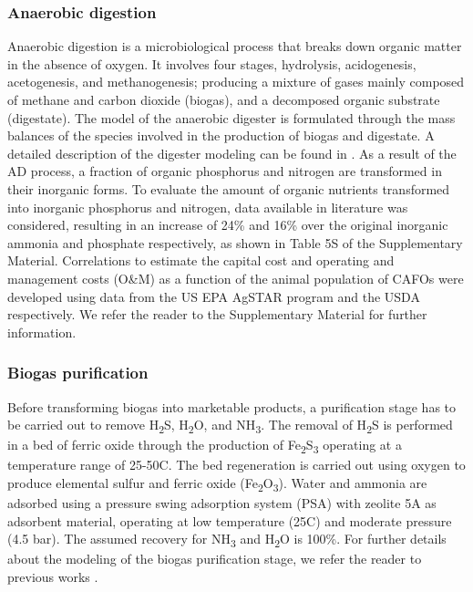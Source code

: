 \begin{refsection}[referencesCh4]
\subsubsection{Anaerobic digestion}
Anaerobic digestion is a microbiological process that breaks down organic matter in the absence of oxygen. It involves four stages, hydrolysis, acidogenesis, acetogenesis, and methanogenesis; producing a mixture of gases mainly composed of methane and carbon dioxide (biogas), and a decomposed organic substrate (digestate). The model of the anaerobic digester is formulated through the mass balances of the species involved in the production of biogas and digestate. A detailed description of the digester modeling can be found in \citet{Leon}. As a result of the AD process, a fraction of organic phosphorus and nitrogen are transformed in their inorganic forms. To evaluate the amount of organic nutrients transformed into inorganic phosphorus and nitrogen, data available in literature was considered, resulting in an increase of 24\% and 16\% over the original inorganic ammonia and phosphate respectively, as shown in Table 5S of the Supplementary Material. Correlations to estimate the capital cost and operating and management costs (O\&M) as a function of the animal population of CAFOs were developed using data from the US EPA AgSTAR program \citep{AgSTAR2003} and the USDA \citep{USDA_OM} respectively. We refer the reader to the Supplementary Material for further information.

\subsubsection{Biogas purification}
Before transforming biogas into marketable products, a purification stage has to be carried out to remove H\textsubscript{2}S, H\textsubscript{2}O, and NH\textsubscript{3}. The removal of H\textsubscript{2}S is performed in a bed of ferric oxide through the production of Fe\textsubscript{2}S\textsubscript{3} operating at a temperature range of 25-50\textdegree C. The bed regeneration is carried out using oxygen to produce elemental sulfur and ferric oxide (Fe\textsubscript{2}O\textsubscript{3}). Water and ammonia are adsorbed using a pressure swing adsorption system (PSA) with zeolite 5A as adsorbent material, operating at low temperature (25\textdegree C) and moderate pressure (4.5 bar). The assumed recovery for NH\textsubscript{3} and H\textsubscript{2}O is 100\%. For further details about the modeling of the biogas purification stage, we refer the reader to previous works \citep{Leon, MartinHernandez}.


\end{refsection}

